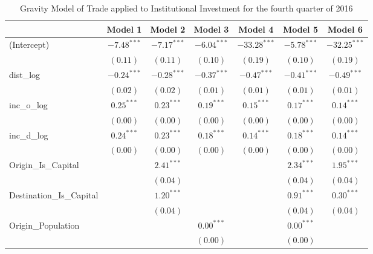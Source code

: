 \begin{table}
	\begin{center}
		\small
		\caption[Gravity Model of trade for Q4 2016]{Gravity Model of Trade applied to Institutional Investment for the fourth quarter of 2016}
		\begin{tabular}{l c c c c c c }
			\hline
			& Model 1 & Model 2 & Model 3 & Model 4 & Model 5 & Model 6 \\
			\hline
			(Intercept)                  & $-7.48^{***}$ & $-7.17^{***}$ & $-6.04^{***}$ & $-33.28^{***}$ & $-5.78^{***}$ & $-32.25^{***}$ \\
			& $(0.11)$      & $(0.11)$      & $(0.10)$      & $(0.19)$       & $(0.10)$      & $(0.19)$       \\
			dist\_log                    & $-0.24^{***}$ & $-0.28^{***}$ & $-0.37^{***}$ & $-0.47^{***}$  & $-0.41^{***}$ & $-0.49^{***}$  \\
			& $(0.02)$      & $(0.02)$      & $(0.01)$      & $(0.01)$       & $(0.01)$      & $(0.01)$       \\
			inc\_o\_log                  & $0.25^{***}$  & $0.23^{***}$  & $0.19^{***}$  & $0.15^{***}$   & $0.17^{***}$  & $0.14^{***}$   \\
			& $(0.00)$      & $(0.00)$      & $(0.00)$      & $(0.00)$       & $(0.00)$      & $(0.00)$       \\
			inc\_d\_log                  & $0.24^{***}$  & $0.23^{***}$  & $0.18^{***}$  & $0.14^{***}$   & $0.18^{***}$  & $0.14^{***}$   \\
			& $(0.00)$      & $(0.00)$      & $(0.00)$      & $(0.00)$       & $(0.00)$      & $(0.00)$       \\
			Origin\_Is\_Capital          &               & $2.41^{***}$  &               &                & $2.34^{***}$  & $1.95^{***}$   \\
			&               & $(0.04)$      &               &                & $(0.04)$      & $(0.04)$       \\
			Destination\_Is\_Capital     &               & $1.20^{***}$  &               &                & $0.91^{***}$  & $0.30^{***}$   \\
			&               & $(0.04)$      &               &                & $(0.04)$      & $(0.04)$       \\
			Origin\_Population           &               &               & $0.00^{***}$  &                & $0.00^{***}$  &                \\
			&               &               & $(0.00)$      &                & $(0.00)$      &                \\

\end{tabular}
\end{center}
\end{table}
